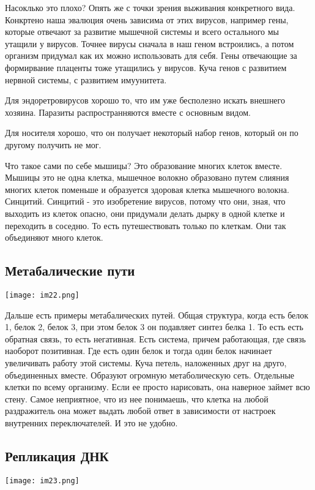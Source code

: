 Насоклько это плохо?
Опять же с точки зрения выживания конкретного вида. Конкртено 
наша эвалюция очень зависима от этих вирусов, например гены, которые 
отвечают за развитие мышечной системы и всего остального мы утащили у вирусов. 
Точнее вирусы сначала в наш геном встроились, а потом организм придумал как их можно 
использовать для себя. Гены отвечающие за формирвание плаценты тоже 
утащились у вирусов. Куча генов с развитием нервной системы, 
с развитием имуунитета. 

Для эндоретровирусов хорошо то, что им уже бесполезно искать внешнего хозяина. 
Паразиты распространняются вместе с основным видом. 

Для носителя хорошо, что он получает некоторый набор генов,
который он по другому получить не мог. 

Что такое сами по себе мышицы? Это образование многих 
клеток вместе. Мышицы это не одна клетка, мышечное 
волокно образовано путем слияния многих клеток поменьше 
и образуется здоровая клетка мышечного волокна. Синцитий. 
Синцитий - это изобретение вирусов, потому что они, зная, 
что выходить из клеток опасно, они придумали делать 
дырку в одной клетке и переходить в соседню. То есть путешествовать только 
по клеткам. Они так объединяют много клеток. 


\subsection{Метабалические пути}
\texttt{[image: im22.png]}

Дальше есть примеры метабалических путей. Общая структура, когда 
есть белок 1, белок 2, белок 3, при этом белок 3 он подавляет синтез белка 1. 
То есть есть обратная связь, то есть негативная. Есть система, причем работающая, 
где связь наоборот позитивная. Где есть один белок и 
тогда один белок начинает увеличивать работу этой системы. Куча петель, наложенных 
друг на друго, объединенных вместе. Образуют огромную метаболическую сеть. Отдельные клетки 
по всему организму. Если ее просто нарисовать, она наверное займет всю стену. Самое 
неприятное, что из нее понимаешь, что клетка на любой раздражитель она может выдать 
любой ответ в зависимости от настроек внутренних переключателей. И это не удобно. 

\subsection{Репликация ДНК}
\texttt{[image: im23.png]}

